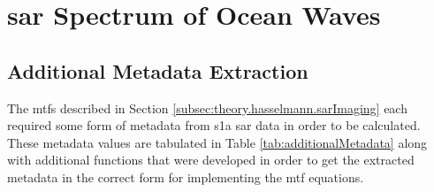 \section{\acs{sar} Spectrum of Ocean Waves} \label{sec:systemDesign.sarSpectrum}

\subsection{Additional Metadata Extraction} \label{subsec:systemDesign.sarSpectrum.metadata}

The \acs{mtf}s described in Section \ref{subsec:theory.hasselmann.sarImaging} each required some form of metadata from \acs{s1a} \acs{sar} data in order to be calculated. These metadata values are tabulated in Table \ref{tab:additionalMetadata} along with additional functions that were developed in order to get the extracted metadata in the correct form for implementing the \acs{mtf} equations.

